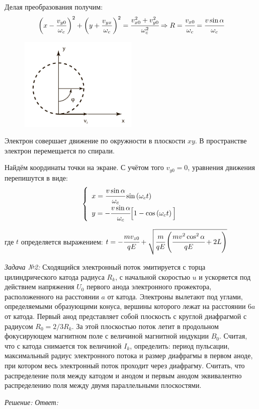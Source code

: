 Делая преобразования получим:
\[
	\left( x - \frac{v_{y0}}{\omega_c} \right)^2 + 
	\left( y + \frac{v_{yx}}{\omega_c} \right)^2 = 
	\cfrac{v^2_{x0} + v^2_{y0}}{\omega^2_c} 
	\Rightarrow R = \cfrac{v_{x0}}{\omega_c} = 
	\cfrac{v\sin\alpha}{\omega_c}
\]

\begin{figure}
    \vspace{-2ex}
    \includegraphics[width=0.5\textwidth]{images/im_02}
\end{figure}

Электрон совершает движение по окружности в плоскости \( xy \). 
В пространстве электрон перемещается по спирали.

Найдём координаты точки на экране. С учётом того \( v_{y0} = 0 \), уравнения 
движения перепишутся в виде:
\[
	\left\{ \begin{array}{ll}
		x = \cfrac{v\sin\alpha}{\omega_c}\sin\left( \omega_c t \right) \\
		y = -\cfrac{v\sin\alpha}{\omega_c}
			\Big[ 1 - \cos\left( \omega_c t \right) \Big]
	\end{array} \right.
\]

где \( t \) определяется выражением:
\(
	t = -\cfrac{mv_{z0}}{qE} + 
	\sqrt{ \cfrac{m}{qE}\left( \cfrac{mv^2\cos^2\alpha}{qE} + 2L \right)} 
\)

\pagebreak


\emph{Задача №2:} Сходящийся электронный поток эмитируется с торца 
цилиндрического катода радиуса \( R_k \), с начальной скоростью \( u \) и 
ускоряется под действием напряжения \( U_0 \) первого анода электронного 
прожектора, расположенного на расстоянии \( a \) от катода. Электроны вылетают 
под углами, определяемыми образующими конуса, вершины которого лежат на 
расстоянии \( 6a \) от катода. Первый анод представляет собой плоскость с 
круглой диафрагмой с радиусом \( R_0 = 2/3 R_k \). За этой плоскостью поток 
летит в продольном фокусирующем магнитном поле с величиной магнитной индукции 
\( B_0 \). Считая, что с катода снимается ток величиной \( I_k \), определить: 
период пульсации, максимальный радиус электронного потока и размер диафрагмы в 
первом аноде, при котором весь электронный поток проходит через диафрагму. 
Считать, что распределение поля между катодом и анодом и первым анодом 
эквивалентно распределению поля между двумя параллельными плоскостями.

\emph{Решение:}
\emph{Ответ:}



